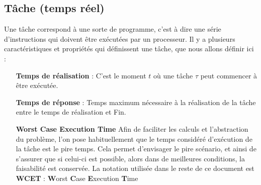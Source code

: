 \documentclass[11pt,a4paper,oneside]{report}
\begin{document}
\subsection{Tâche (temps réel)}
Une tâche correspond à une sorte de programme, c'est à dire une série d'instructions 
qui doivent être exécutées par un processeur. 
Il y a plusieurs caractéristiques 
et propriétés qui définissent une tâche, que nous allons définir ici : 
\begin{itemize}
    \item[\textbf{Temps de réalisation}] : C'est le moment $t$ où une tâche $\tau$ peut commencer à être exécutée.
    \item[\textbf{Temps de réponse\label{Response Time}}] : Temps maximum nécessaire à la réalisation de la tâche 
    entre le temps de réalisation et Fin.
    \item[\textbf{Worst Case Execution Time}] Afin de faciliter les calculs et l'abstraction du problème, l'on pose habituellement que le temps considéré d'exécution de 
    la tâche est le pire temps. Cela permet d'envisager le pire scénario, et ainsi 
    de s'assurer que si celui-ci est possible, alors dans de meilleures conditions, 
    la faisabilité est conservée. La notation utilisée dans le reste de ce document 
    est  \textbf{WCET} : \textbf{W}orst \textbf{C}ase \textbf{E}xecution \textbf{T}ime
    

\end{itemize}
\end{document}
